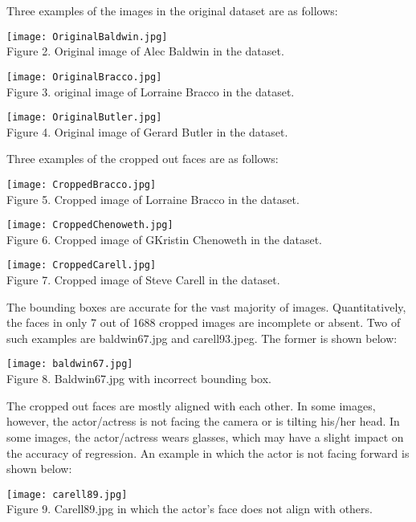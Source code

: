 \documentclass{article}
\begin{document}
Three examples of the images in the original dataset are as follows:
\begin{center}
\texttt{[image: OriginalBaldwin.jpg]}\\
Figure 2. Original image of Alec Baldwin in the dataset.
\end{center}
\begin{center}
\texttt{[image: OriginalBracco.jpg]}\\
Figure 3. original image of Lorraine Bracco in the dataset.
\end{center}
\begin{center}
\texttt{[image: OriginalButler.jpg]}\\
Figure 4. Original image of Gerard Butler in the dataset.
\end{center}

Three examples of the cropped out faces are as follows:
\begin{center}
\texttt{[image: CroppedBracco.jpg]}\\
Figure 5. Cropped image of Lorraine Bracco in the dataset.
\end{center}
\begin{center}
\texttt{[image: CroppedChenoweth.jpg]}\\
Figure 6. Cropped image of GKristin Chenoweth in the dataset.
\end{center}
\begin{center}
\texttt{[image: CroppedCarell.jpg]}\\
Figure 7. Cropped image of Steve Carell in the dataset.
\end{center}

The bounding boxes are accurate for the vast majority of images. Quantitatively, the faces in only 7 out of 1688 cropped images are incomplete or absent. Two of such examples are baldwin67.jpg and carell93.jpeg. The former is shown below:
\begin{center}
\texttt{[image: baldwin67.jpg]}\\
Figure 8. Baldwin67.jpg with incorrect bounding box.
\end{center}

\par The cropped out faces are mostly aligned with each other. In some images, however, the actor/actress is not facing the camera or is tilting his/her head. In some images, the actor/actress wears glasses, which may have a slight impact on the accuracy of regression. An example in which the actor is not facing forward is shown below:
\begin{center}
\texttt{[image: carell89.jpg]}\\
Figure 9. Carell89.jpg in which the actor's face does not align with others.
\end{center}
\end{document}
